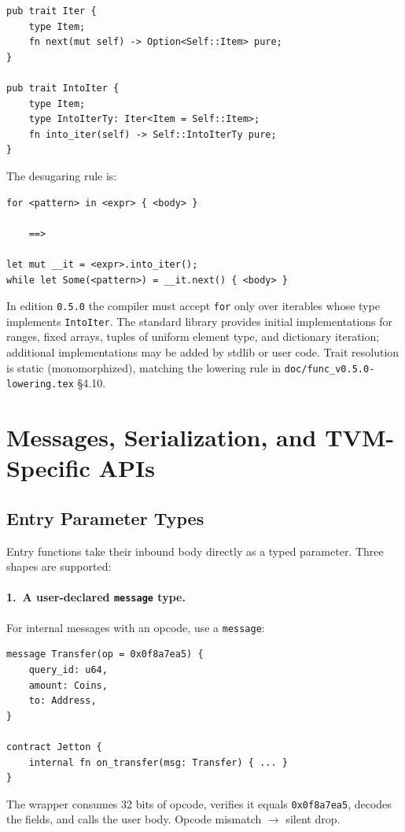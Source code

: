 \documentclass[12pt,oneside]{article}
\begin{document}
\begin{verbatim}
pub trait Iter {
    type Item;
    fn next(mut self) -> Option<Self::Item> pure;
}

pub trait IntoIter {
    type Item;
    type IntoIterTy: Iter<Item = Self::Item>;
    fn into_iter(self) -> Self::IntoIterTy pure;
}
\end{verbatim}

The desugaring rule is:

\begin{verbatim}
for <pattern> in <expr> { <body> }

    ==>

let mut __it = <expr>.into_iter();
while let Some(<pattern>) = __it.next() { <body> }
\end{verbatim}

In edition \verb|0.5.0| the compiler must accept \verb|for| only over
iterables whose type implements \verb|IntoIter|. The standard library provides
initial implementations for ranges, fixed arrays, tuples of uniform element
type, and dictionary iteration; additional implementations may be added by
stdlib or user code. Trait resolution is static (monomorphized), matching the
lowering rule in \verb|doc/func_v0.5.0-lowering.tex| \S4.10.

\section{Messages, Serialization, and TVM-Specific APIs}
\subsection{Entry Parameter Types}
\label{sec:entry-typed}
Entry functions take their inbound body directly as a typed parameter.
Three shapes are supported:

\paragraph{1.\ A user-declared \texttt{message} type.}
For internal messages with an opcode, use a \verb|message|:

\begin{verbatim}
message Transfer(op = 0x0f8a7ea5) {
    query_id: u64,
    amount: Coins,
    to: Address,
}

contract Jetton {
    internal fn on_transfer(msg: Transfer) { ... }
}
\end{verbatim}

The wrapper consumes 32 bits of opcode, verifies it equals \verb|0x0f8a7ea5|,
decodes the fields, and calls the user body. Opcode mismatch $\to$
silent drop.
\end{document}
